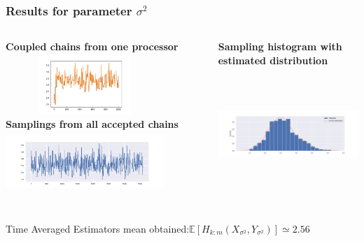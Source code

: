 \documentclass{beamer}
\begin{document}
\begin{frame}
	\frametitle{Results for parameter $\sigma^2$}
	\begin{columns}
		\begin{column}{0.4\textwidth}
			{\scriptsize \textbf{Coupled chains from one processor}}\\
			\includegraphics[width=6cm,height=2.3cm]{doublecoupling_chainmeeting/doublecoupling_sigma_chain_meeting}
			\vspace{0.2cm}
			{	\scriptsize \textbf{Samplings from all accepted chains }}\\
			\includegraphics[width=6cm,height=2.3cm]{doublecoupling_pack/doublecoupling_sampling_sigma}
		\end{column}
		\begin{column}{0.4\textwidth}
			{\scriptsize \textbf{Sampling histogram with estimated distribution}}\\
			\includegraphics[width=6cm,height=5cm]{doublecoupling_pack/doublecoupling_sigma_histogram_kernel}
		\end{column}
	\end{columns}
	
	\small
	Time Averaged Estimators mean obtained:$\mathbb{E}[H_{k:m}(X_{\sigma^2}, Y_{\sigma^2})] \simeq 2.56   %
	$
	
\end{frame}

	
\end{document}
